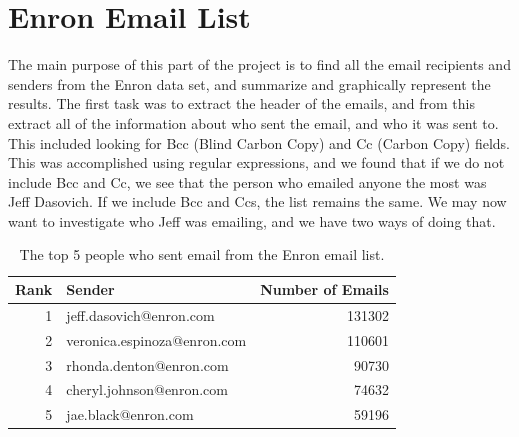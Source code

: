 \documentclass[12pt, a4paper, oneside]{amsart}
\begin{document}
\section{Enron Email List}
The main purpose of this part of the project is to find all the email recipients and senders from the Enron data set, and summarize and graphically represent the results.  The first task was to extract the header of the emails, and from this extract all of the information about who sent the email, and who it was sent to.  This included looking for Bcc (Blind Carbon Copy) and Cc (Carbon Copy) fields.\\
This was accomplished using regular expressions, and we found that if we do not include Bcc and Cc, we see that the person who emailed anyone the most was Jeff Dasovich.  If we include Bcc and Ccs, the list remains the same.  We may now want to investigate who Jeff was emailing, and we have two ways of doing that.\\ 
\begin{table}[h]
\begin{center}
\begin{tabular}{|r|l|r|}
  \hline
Rank & Sender & Number of Emails \\ 
  \hline
1 & jeff.dasovich@enron.com & 131302 \\ 
2 & veronica.espinoza@enron.com & 110601 \\ 
3 & rhonda.denton@enron.com & 90730 \\ 
4 & cheryl.johnson@enron.com & 74632 \\ 
5 & jae.black@enron.com & 59196 \\ 
 \hline
\end{tabular}
\caption{The top 5 people who sent email from the Enron email list.}
\label{table:allLibs}
\end{center}
\end{table}
\end{document}
